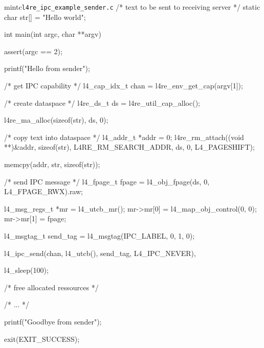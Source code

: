 \begin{mintlisting}[label=lst:l4re_ipc_example_sender]{mintc}{\texttt{l4re\_ipc\_example\_sender.c}}
/* text to be sent to receiving server */
static char str[] = "Hello world";

int
main(int argc, char **argv)
{
  assert(argc == 2);

  printf("Hello from sender\n");

  /* get IPC capability */
  l4_cap_idx_t chan = l4re_env_get_cap(argv[1]);

  /* create dataspace */
  l4re_ds_t ds = l4re_util_cap_alloc();

  l4re_ma_alloc(sizeof(str), ds, 0);

  /* copy text into dataspace */
  l4_addr_t *addr = 0;
  l4re_rm_attach((void **)&addr,
                 sizeof(str),
                 L4RE_RM_SEARCH_ADDR,
                 ds,
                 0,
                 L4_PAGESHIFT);

  memcpy(addr, str, sizeof(str));

  /* send IPC message */
  l4_fpage_t fpage = l4_obj_fpage(ds, 0, L4_FPAGE_RWX).raw;

  l4_msg_regs_t *mr = l4_utcb_mr();
  mr->mr[0] = l4_map_obj_control(0, 0);
  mr->mr[1] = fpage;

  l4_msgtag_t send_tag = l4_msgtag(IPC_LABEL, 0, 1, 0);

  l4_ipc_send(chan, l4_utcb(), send_tag, L4_IPC_NEVER),

  l4_sleep(100);

  /* free allocated ressources */

  /* ... */

  printf("Goodbye from sender\n");

  exit(EXIT_SUCCESS);
}
\end{mintlisting}

